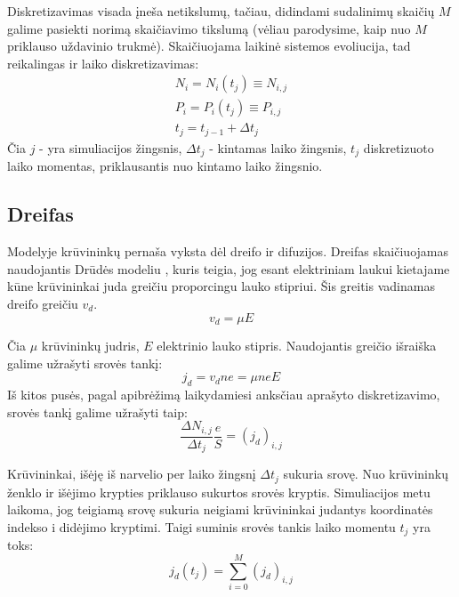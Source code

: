 Diskretizavimas visada įneša netikslumų, tačiau, didindami sudalinimų skaičių \(M\) galime pasiekti norimą skaičiavimo tikslumą (vėliau parodysime, kaip nuo \(M\) priklauso uždavinio trukmė).
Skaičiuojama laikinė sistemos evoliucija, tad reikalingas ir laiko diskretizavimas:
\begin{equation}
\begin{array}{c}
N_i = N_i(t_j) \equiv N_{i,j}\\
P_i = P_i(t_j) \equiv P_{i,j}\\
t_j = t_{j-1} + \Delta t_j
\end{array}
\end{equation}
Čia \(j\) - yra simuliacijos žingsnis, \(\Delta t_j\) - kintamas laiko žingsnis, \(t_j\) diskretizuoto laiko momentas, priklausantis nuo kintamo laiko žingsnio.

\subsection{Dreifas}

Modelyje krūvininkų pernaša vyksta dėl dreifo ir difuzijos. Dreifas skaičiuojamas naudojantis Drūdės modeliu \cite{ashcroft}, kuris teigia, jog esant elektriniam laukui kietajame kūne krūvininkai juda greičiu proporcingu lauko stipriui. Šis greitis vadinamas dreifo greičiu \(v_d\).
\begin{equation}
	v_d= \mu E
\end{equation}
	
Čia \(\mu\) krūvininkų judris, \(E\) elektrinio lauko stipris.
Naudojantis greičio išraiška galime užrašyti srovės tankį:
\begin{equation} \label{eq:tankis}
	j_d = v_d n e = \mu n e E
\end{equation}
Iš kitos pusės, pagal apibrėžimą laikydamiesi anksčiau aprašyto diskretizavimo, srovės tankį galime užrašyti taip:
\begin{equation} \label{eq:pokytis}
\frac{\Delta N_{i,j}}{\Delta t_j} \frac{e}{S}=(j_d)_{i,j}
\end{equation}
	
Krūvininkai, išėję iš narvelio per laiko žingsnį \(\Delta t_j\) sukuria srovę. Nuo krūvininkų ženklo ir išėjimo krypties priklauso sukurtos srovės kryptis. Simuliacijos metu laikoma, jog teigiamą srovę sukuria neigiami krūvininkai judantys koordinatės indekso i didėjimo kryptimi.
Taigi suminis srovės tankis laiko momentu \(t_j\) yra toks:
\begin{equation}
j_d(t_j)= \sum_{i=0}^{M} (j_d)_{i,j}
\end{equation}
	

